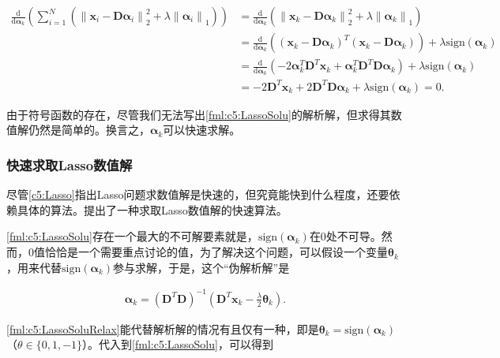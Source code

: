 \begin{equation}\label{fml:c5:LassoSolu}
	\begin{aligned}
		\frac{\mathrm{d}}{\mathrm{d}\bm{\alpha}_k} \left(\sum_{i=1}^{N} \left({\lVert \mathbf{x}_i - \mathbf{D}\bm{\alpha}_i \rVert}_2^2 + \lambda {\lVert \bm{\alpha}_i \rVert}_1 \right) \right) &= \frac{\mathrm{d}}{\mathrm{d}\bm{\alpha}_k} \left( {\lVert \mathbf{x}_k - \mathbf{D}\bm{\alpha}_k \rVert}_2^2 + \lambda {\lVert \bm{\alpha}_k \rVert}_1 \right) \\
		&= \frac{\mathrm{d}}{\mathrm{d}\bm{\alpha}_k} \left( (\mathbf{x}_k - \mathbf{D}\bm{\alpha}_k)^T(\mathbf{x}_k - \mathbf{D}\bm{\alpha}_k) \right) + \lambda\mathrm{sign}(\bm{\alpha}_k)\\
		&= \frac{\mathrm{d}}{\mathrm{d}\bm{\alpha}_k} \left( -2\bm{\alpha}_k^T\mathbf{D}^T\mathbf{x}_k + \bm{\alpha}_k^T\mathbf{D}^T\mathbf{D}\bm{\alpha}_k \right) + \lambda\mathrm{sign}(\bm{\alpha}_k)\\
		&= -2 \mathbf{D}^T\mathbf{x}_k + 2 \mathbf{D}^T\mathbf{D} \bm{\alpha}_k + \lambda \mathrm{sign}(\bm{\alpha}_k) = 0.
	\end{aligned}
\end{equation}

由于符号函数的存在，尽管我们无法写出\eqref{fml:c5:LassoSolu}的解析解，但求得其数值解仍然是简单的。换言之，$\bm{\alpha}_k$可以快速求解。

\subsubsection{快速求取Lasso数值解}
尽管\autoref{c5:Lasso}指出Lasso问题求数值解是快速的，但究竟能快到什么程度，还要依赖具体的算法。提出了一种求取Lasso数值解的快速算法。

\eqref{fml:c5:LassoSolu}存在一个最大的不可解要素就是，$\mathrm{sign}(\bm{\alpha}_k)$在0处不可导。然而，0值恰恰是一个需要重点讨论的值，为了解决这个问题，可以假设一个变量$\bm{\theta}_k$，用来代替$\mathrm{sign}(\bm{\alpha}_k)$参与求解，于是，这个``伪解析解''是

\begin{equation}\label{fml:c5:LassoSoluRelax}
	\begin{aligned}
		\bm{\alpha}_k = (\mathbf{D}^T\mathbf{D})^{-1}(\mathbf{D}^T\mathbf{x}_k-\frac{\lambda}{2}\bm{\theta}_k).
	\end{aligned}
\end{equation}

\eqref{fml:c5:LassoSoluRelax}能代替解析解的情况有且仅有一种，即是$\bm{\theta}_k=\mathrm{sign}(\bm{\alpha}_k)$（$\theta \in \{0, 1, -1\}$）。代入到\eqref{fml:c5:LassoSolu}，可以得到

